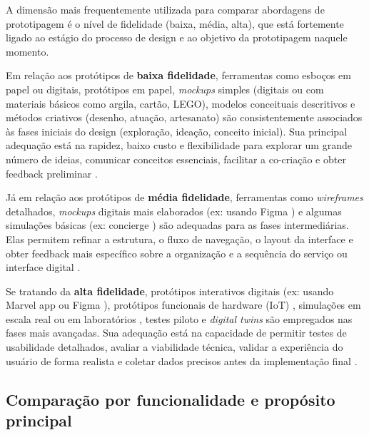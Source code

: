 A dimensão mais frequentemente utilizada para comparar abordagens de prototipagem é o nível de fidelidade (baixa, média, alta), que está fortemente ligado ao estágio do processo de design e ao objetivo da prototipagem naquele momento.

Em relação aos protótipos de \textbf{baixa fidelidade}, ferramentas como esboços em papel ou digitais, protótipos em papel, \textit{mockups} simples (digitais ou com materiais básicos como argila, cartão, LEGO), modelos conceituais descritivos e métodos criativos (desenho, atuação, artesanato) são consistentemente associados às fases iniciais do design (exploração, ideação, conceito inicial). Sua principal adequação está na rapidez, baixo custo e flexibilidade para explorar um grande número de ideias, comunicar conceitos essenciais, facilitar a co-criação e obter feedback preliminar \cite{paust2025integrative, mager2023product, Vieira2025, asbjornsen2022echange, kumar2023rheumatology, lee2023industry, seko2024transitions, soto2023prototyping, villa2022integratedcare, Suryawati2024, wang2023smartproducts}.

Já em relação aos protótipos de \textbf{média fidelidade}, ferramentas como \textit{wireframes} detalhados, \textit{mockups} digitais mais elaborados (ex: usando Figma \cite{villa2022integratedcare}) e algumas simulações básicas (ex: concierge \cite{Suryawati2024}) são adequadas para as fases intermediárias. Elas permitem refinar a estrutura, o fluxo de navegação, o layout da interface e obter feedback mais específico sobre a organização e a sequência do serviço ou interface digital \cite{villa2022integratedcare, Suryawati2024, nguyen2022human}.

Se tratando da \textbf{alta fidelidade}, protótipos interativos digitais (ex: usando Marvel app \cite{asbjornsen2022echange} ou Figma \cite{villa2022integratedcare}), protótipos funcionais de hardware (IoT) \cite{Kim2024}, simulações em escala real ou em laboratórios \cite{seko2024transitions, soto2023prototyping, yan2022pssvalue}, testes piloto \cite{seko2024transitions} e \textit{digital twins} \cite{mager2023product} são empregados nas fases mais avançadas. Sua adequação está na capacidade de permitir testes de usabilidade detalhados, avaliar a viabilidade técnica, validar a experiência do usuário de forma realista e coletar dados precisos antes da implementação final \cite{paust2025integrative, asbjornsen2022echange, mager2023product, villa2022integratedcare, Kim2024}.

\subsection{Comparação por funcionalidade e propósito principal}

